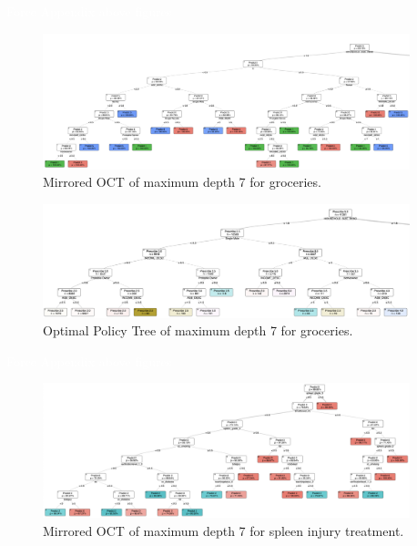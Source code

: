 \documentclass[10pt]{article} %
\begin{document}
\textcolor{white}{Force Appendix above figures}
\begin{figure}
  \begin{center}
    \caption{Mirrored OCT of maximum depth 7 for groceries.}\label{fig:groceries-octpnn} \includegraphics[width=0.95\textwidth,height=0.35\textwidth] {images/Groceries_OCT_seed2_iter2.png}
    \end{center}
\end{figure}

\begin{figure}
  \begin{center}
    \caption{Optimal Policy Tree of maximum depth 7 for groceries.}\label{fig:groceries-opt}
  \includegraphics[width=0.95\textwidth,height=0.3\textwidth]{images/Groceries_OPT_seed2_iter2.png}
  \end{center}
\end{figure}


\textcolor{white}{Force Appendix above figures}
\begin{figure}
  \begin{center}
    \caption{Mirrored OCT of maximum depth 7 for spleen injury treatment.}\label{fig:spleen-octpnn} \includegraphics[width=0.95\textwidth,height=0.4\textwidth] {images/Spleen_OCT_seed3_iter1.png}
    \end{center}
\end{figure}
\end{document}
